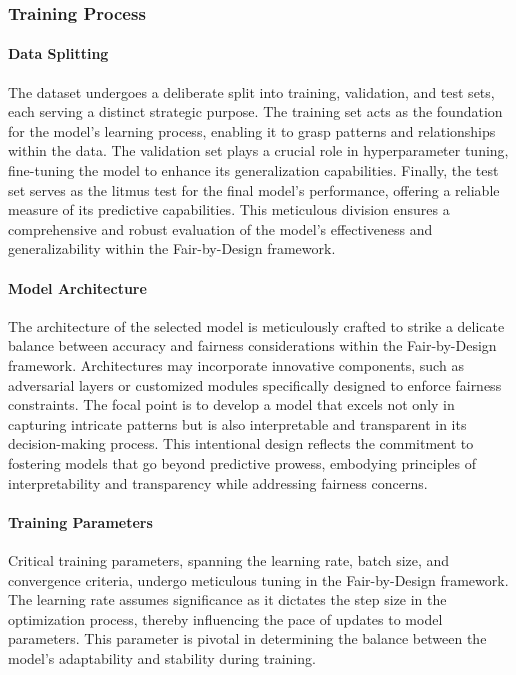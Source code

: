 \subsubsection{Training Process}

\paragraph{Data Splitting}

The dataset undergoes a deliberate split into training, validation, and test sets, each serving a distinct strategic purpose. The training set acts as the foundation for the model's learning process, enabling it to grasp patterns and relationships within the data. The validation set plays a crucial role in hyperparameter tuning, fine-tuning the model to enhance its generalization capabilities. Finally, the test set serves as the litmus test for the final model's performance, offering a reliable measure of its predictive capabilities. This meticulous division ensures a comprehensive and robust evaluation of the model's effectiveness and generalizability within the Fair-by-Design framework.

\paragraph{Model Architecture}

The architecture of the selected model is meticulously crafted to strike a delicate balance between accuracy and fairness considerations within the Fair-by-Design framework. Architectures may incorporate innovative components, such as adversarial layers or customized modules specifically designed to enforce fairness constraints. The focal point is to develop a model that excels not only in capturing intricate patterns but is also interpretable and transparent in its decision-making process. This intentional design reflects the commitment to fostering models that go beyond predictive prowess, embodying principles of interpretability and transparency while addressing fairness concerns.

\paragraph{Training Parameters}

Critical training parameters, spanning the learning rate, batch size, and convergence criteria, undergo meticulous tuning in the Fair-by-Design framework. The learning rate assumes significance as it dictates the step size in the optimization process, thereby influencing the pace of updates to model parameters. This parameter is pivotal in determining the balance between the model's adaptability and stability during training.

